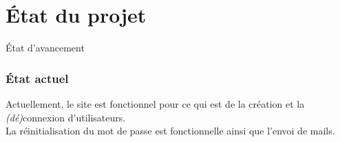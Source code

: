 \section{État du projet}
    
    \begin{frame}
        
        \begin{center}
            \huge{État d'avancement}
        \end{center}
        
    \end{frame}
    
    \begin{frame}
        \frametitle{État actuel}
        Actuellement, le site est fonctionnel pour ce qui est de la création et la \textit{(dé)}connexion d'utilisateurs.\\
        La réinitialisation du mot de passe est fonctionnelle ainsi que l'envoi de mails. \\
        
    \end{frame}